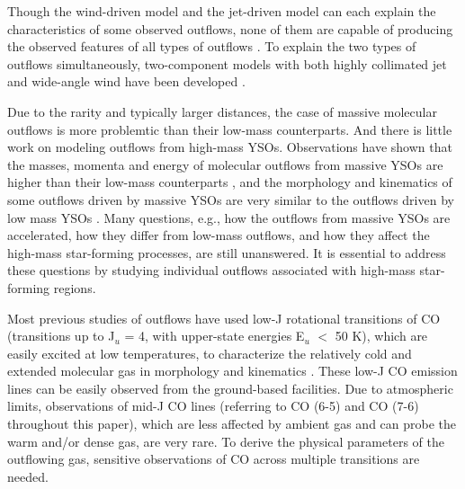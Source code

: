 Though the wind-driven model and the jet-driven model can each explain the characteristics of some observed outflows, none of them are capable of producing the observed features of all types of outflows \citep{2002ApJ...576..294L}. To explain the two types of outflows simultaneously, two-component models with both highly collimated jet and wide-angle wind have been developed \citep{2006ApJ...641..949B, 2006MNRAS.365.1131P, 2006ApJ...649..845S, 2007prpl.conf..277P, 2008ApJ...676.1088M, 2017arXiv171100384M}.

Due to the rarity and typically larger distances, the case of massive molecular outflows is more problemtic than their low-mass counterparts. And there is little work on modeling outflows from high-mass YSOs. Observations have shown that the masses, momenta and energy of molecular outflows from massive YSOs are higher than their low-mass counterparts \citep{2002A&A...383..892B, 2005AJ....129..330W}, and the morphology and kinematics of some outflows driven by massive YSOs are very similar to the outflows driven by low mass YSOs \citep[][]{1998ApJ...507..861S, 2002A&A...387..931B, 2008A&A...485..137C, 2009ApJ...696...66Q, 2011MNRAS.415L..49R, 2012ApJ...744L..26S}. Many questions, e.g., how the outflows from massive YSOs are accelerated, how they differ from low-mass outflows, and how they affect the high-mass star-forming processes, are still unanswered. It is essential to address these questions by studying individual outflows associated with high-mass star-forming regions. 

Most previous studies of outflows have used low-J rotational transitions of CO (transitions up to J$_u$ = 4, with upper-state energies E$_u$ $<$ 50 K), which are easily excited at low temperatures, to characterize the relatively cold and extended molecular gas in morphology and kinematics \citep{1998ApJ...507..861S, 2004ApJ...604..258S, 2008ApJ...675..454Y, 2009ApJ...696...66Q, 2009A&A...495..169S, 2013ApJ...774...39A, 2016ApJ...832..158Z}. These low-J CO emission lines can be easily observed from the ground-based facilities. Due to atmospheric limits, observations of mid-J CO lines (referring to CO (6-5) and CO (7-6) throughout this paper), which are less affected by ambient gas and can probe the warm and/or dense gas, are very rare. To derive the physical parameters of the outflowing gas, sensitive observations of CO across multiple transitions are needed. 



